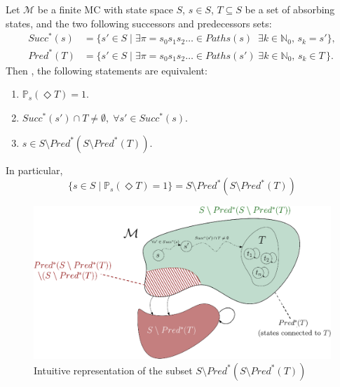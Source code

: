\begin{theorem}\label{asr}
  Let $\mathcal{M}$ be a finite MC with state space $S$, $s \in S$, $T \subseteq S$ be a set of absorbing states, and the two following successors and predecessors sets:
\begin{align*}
  Succ^*(s) &= \{ s' \in S \; | \; \exists \pi = s_0s_1s_2\dots \in Paths(s) \;\; \exists k \in \mathbb{N}_0, \, s_k = s' \}, \\
  Pred^*(T) &= \{ s' \in S \; | \; \exists \pi = s_0s_1s_2\dots \in Paths(s')\; \exists k \in \mathbb{N}_0, \, s_{k} \in T \,\}.
\end{align*}
   Then , the following statements are equivalent:
  \begin{enumerate}[(a.)]
    \item $\mathbb{P}_s(\Diamond T)= 1$. \label{succ1}
    \item $Succ^*(s') \cap T \neq \emptyset, \; \forall s' \in Succ^*(s)$.\label{succ2}
    \item $s \in S \setminus Pred^*(S \setminus Pred^*(T))$. \label{succ3}
  \end{enumerate}
  In particular, \[
  \{s \in S \; | \; \mathbb{P}_s(\Diamond T) = 1\} =
  S \setminus Pred^*(S \setminus Pred^*(T))
  \]
  \begin{figure}[h]
  \centering
  \includegraphics[width=0.93\linewidth]{resources/S2BSCC}
  \caption{Intuitive representation of the subset $S \setminus Pred^*(S \setminus Pred^*(T))$}\label{spred}
  \end{figure}
\end{theorem}
